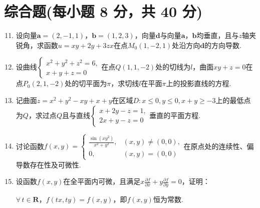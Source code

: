 \documentclass[../Main.tex]{subfiles}
\begin{document}
\section{综合题(每小题 8 分，共 40 分)}
\begin{enumerate}
    \setcounter{enumi}{10}
    \item 设向量$\boldsymbol{a}=(2,-1,1)$，$\boldsymbol{b}=(1,2,3)$，向量$\boldsymbol
              {d}$与向量$\boldsymbol{a}$，$\boldsymbol{b}$均垂直，且与$z$轴夹锐角，求函数$u
              =xy+2y+3zx$在点$M_{0}(1,-2,1)$处沿方向$\boldsymbol{d}$的方向导数.
          \vspace{13em}

    \item 设曲线$\begin{cases}
                  x^{2}+y^{2}+z^{2}=6, \\
                  x+y+z=0
              \end{cases}$在点$Q(1,1,-2)$处的切线为$l$，曲面$xy+z=0$在点$P_{0}(2,1,-2)$处的切平面为$\pi$，求切线$l$在平面$\pi$上的投影直线的方程.
          \vspace{10em}

    \item 记曲面$z=x^{2}+y^{2}-xy+x+y$在区域$D:x\leq 0,y\leq 0,x+y\geq -3$上的最低点为$Q$，求过点$Q$且与直线$\begin{cases}
                  x+2y-z=1, \\
                  2x+y-z=0
              \end{cases}$垂直的平面方程.
          \vspace{10em}

    \item 讨论函数$f(x,y)=
              \begin{cases}
                  \frac{\sin(xy^{2})}{x^{2}+y^{2}}, & (x,y)\neq(0,0), \\
                  0,                                & (x,y)=(0,0)
              \end{cases}$在原点处的连续性、偏导数存在性及可微性.
          \vspace{10em}

    \item 设函数$f(x,y)$在全平面内可微，且满足$x\frac{\partial f}{\partial
                  x}+y\frac{\partial f}{\partial y}=0$，证明：

          $\forall\,t\in\mathbf{R}$，$f(tx,ty)=f(x,y)$，即$f(x,y)$恒为常数.
          \vspace{10em}
\end{enumerate}
\end{document}
